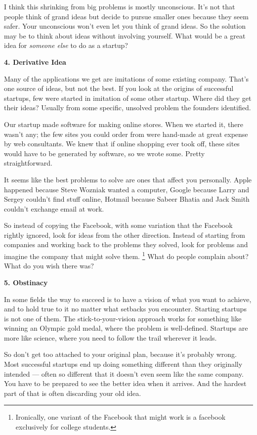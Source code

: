 I think this shrinking from big problems is mostly unconscious. It's not
that people think of grand ideas but decide to pursue smaller ones
because they seem safer. Your unconscious won't even let you think of
grand ideas. So the solution may be to think about ideas without
involving yourself. What would be a great idea for \emph{someone else}
to do as a startup?

\textbf{4. Derivative Idea}

Many of the applications we get are imitations of some existing company.
That's one source of ideas, but not the best. If you look at the origins
of successful startups, few were started in imitation of some other
startup. Where did they get their ideas? Usually from some specific,
unsolved problem the founders identified.

Our startup made software for making online stores. When we started it,
there wasn't any; the few sites you could order from were hand-made at
great expense by web consultants. We knew that if online shopping ever
took off, these sites would have to be generated by software, so we
wrote some. Pretty straightforward.

It seems like the best problems to solve are ones that affect you
personally. Apple happened because Steve Wozniak wanted a computer,
Google because Larry and Sergey couldn't find stuff online, Hotmail
because Sabeer Bhatia and Jack Smith couldn't exchange email at work.

So instead of copying the Facebook, with some variation that the
Facebook rightly ignored, look for ideas from the other direction.
Instead of starting from companies and working back to the problems they
solved, look for problems and imagine the company that might solve them.
\footnote{Ironically, one variant of the Facebook that might work is a
facebook exclusively for college students.} What do people complain about? What do you wish
there was?

\textbf{5. Obstinacy}

In some fields the way to succeed is to have a vision of what you want
to achieve, and to hold true to it no matter what setbacks you
encounter. Starting startups is not one of them. The
stick-to-your-vision approach works for something like winning an
Olympic gold medal, where the problem is well-defined. Startups are more
like science, where you need to follow the trail wherever it leads.

So don't get too attached to your original plan, because it's probably
wrong. Most successful startups end up doing something different than
they originally intended --- often so different that it doesn't even
seem like the same company. You have to be prepared to see the better
idea when it arrives. And the hardest part of that is often discarding
your old idea.

